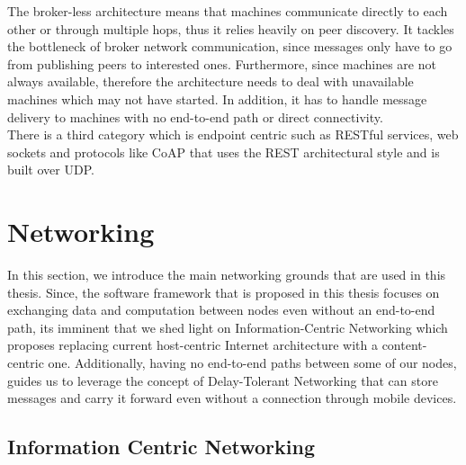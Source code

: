 \noindent The broker-less architecture means that machines communicate directly to each other or through multiple hops, thus it relies heavily on peer discovery. It tackles the bottleneck of broker network communication, since messages only have to go from publishing peers to interested ones.  Furthermore, since machines are not always available, therefore the architecture needs to deal with unavailable machines which may not have started. In addition, it has to handle message delivery to machines with no end-to-end path or direct connectivity.  \\


\noindent There is a third category which is endpoint centric such as RESTful services, web sockets and protocols like CoAP \cite{coAP} that uses the REST architectural style and is built over UDP.

\section{Networking}

In this section, we introduce the main networking grounds that are used in this thesis. Since, the software framework that is proposed in this thesis focuses on exchanging data and computation between nodes even without an end-to-end path, its imminent that we shed light on Information-Centric Networking which proposes replacing current host-centric  Internet architecture  with a content-centric one. Additionally,  having no end-to-end paths between some  of our nodes, guides us to leverage the concept of Delay-Tolerant Networking that can store messages and carry it forward even without a connection through mobile devices.
\subsection{Information Centric Networking}

